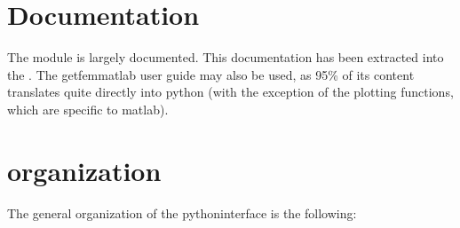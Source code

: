 \documentclass[a4paper,11pt,english]{sphinxmanual}
\begin{document}
\section{Documentation}
\label{\detokenize{python/pygf:documentation}}
The  module is largely documented. This documentation has been
extracted into the {\hyperref[\detokenize{python/cmdref:api}]{}}. The getfem\sphinxhyphen{}matlab user guide may also be used,
as 95\% of its content translates quite directly into python (with the exception
of the plotting functions, which are specific to matlab).


\section{  organization}
\label{\detokenize{python/pygf:py-gf-organization}}
The general organization of the python\sphinxhyphen{}interface is the following:
\end{document}
